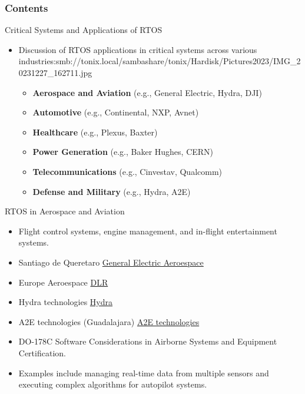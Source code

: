 \documentclass[10pt]{beamer}
\title[Universidad Panamericana]{}
\subtitle{Critical Systems and Applications of RTOS}
\author[]{Name}
\institute[ltonix@up.edu.mx]{Universidad Panamericana}
\date[Presentation \today]
{Presentation \today}
\begin{document}
\frame{\titlepage}
\begin{frame}
\frametitle{Contents}
\tableofcontents
\end{frame}


\begin{frame}{Critical Systems and Applications of RTOS}
    \begin{itemize}
        \item Discussion of RTOS applications in critical systems across various industries:smb://tonix.local/sambashare/tonix/Hardisk/Pictures2023/IMG_20231227_162711.jpg
        \begin{itemize}
            \item \textbf{Aerospace and Aviation} (e.g., General Electric, Hydra, DJI)
            \item \textbf{Automotive} (e.g., Continental, NXP, Avnet)
            \item \textbf{Healthcare} (e.g., Plexus, Baxter)
            \item \textbf{Power Generation} (e.g., Baker Hughes, CERN)
            \item \textbf{Telecommunications} (e.g., Cinvestav, Qualcomm)
            \item \textbf{Defense and Military} (e.g., Hydra, A2E)
        \end{itemize}
    \end{itemize}
\end{frame}

\begin{frame}{RTOS in Aerospace and Aviation}
    \begin{itemize}
        \item Flight control systems, engine management, and in-flight entertainment systems.
        \item Santiago de Queretaro \href{https://www.geaerospace.com/commercial}{General Electric Aeroespace}
        \item Europe Aeroespace \href{https://www.dlr.de/en/careers/your-entry/your-specialist-field/research-funding-knowledge-management}{DLR}
        \item Hydra technologies \href{https://www.hydra-technologies.com/}{Hydra}
        \item A2E technologies (Guadalajara) \href{https://www.a2etechnologies.com/}{A2E technologies}
        \item DO-178C Software Considerations in Airborne Systems and Equipment Certification.
        \item Examples include managing real-time data from multiple sensors and executing complex algorithms for autopilot systems.
    \end{itemize}
\end{frame}
\end{document}
